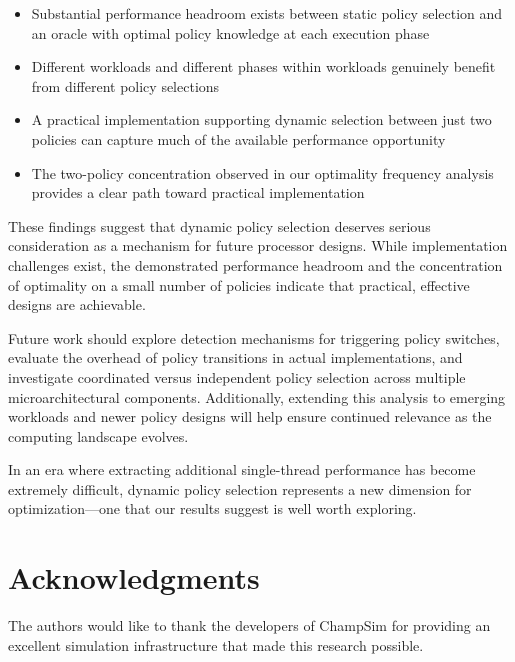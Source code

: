 \documentclass[conference]{IEEEtran}
\begin{document}
\begin{itemize}
\item Substantial performance headroom exists between static policy selection and an oracle with optimal policy knowledge at each execution phase
\item Different workloads and different phases within workloads genuinely benefit from different policy selections
\item A practical implementation supporting dynamic selection between just two policies can capture much of the available performance opportunity
\item The two-policy concentration observed in our optimality frequency analysis provides a clear path toward practical implementation
\end{itemize}

These findings suggest that dynamic policy selection deserves serious consideration as a mechanism for future processor designs. While implementation challenges exist, the demonstrated performance headroom and the concentration of optimality on a small number of policies indicate that practical, effective designs are achievable.

Future work should explore detection mechanisms for triggering policy switches, evaluate the overhead of policy transitions in actual implementations, and investigate coordinated versus independent policy selection across multiple microarchitectural components. Additionally, extending this analysis to emerging workloads and newer policy designs will help ensure continued relevance as the computing landscape evolves.

In an era where extracting additional single-thread performance has become extremely difficult, dynamic policy selection represents a new dimension for optimization---one that our results suggest is well worth exploring.

\section*{Acknowledgments}

The authors would like to thank the developers of ChampSim for providing an excellent simulation infrastructure that made this research possible.



\end{document}
